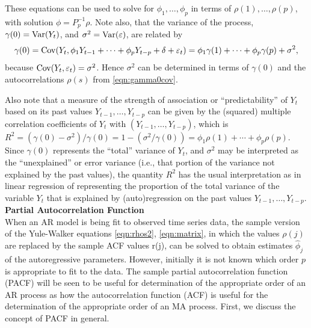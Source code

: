 These equations can be used to solve for $\phi_1, \ldots, \phi_p$ in terms of $\rho(1), \ldots, \rho(p)$, with solution $\phi = P_p^{-1} \rho$. Note also, that the variance of the process, $\gamma(0) = \operatorname{Var}(Y_t)$, and $\sigma^2= \operatorname{Var}(\varepsilon)$, are related by
	\begin{equation} \label{eqn:gamma0cov}
	\gamma(0)= \cov(Y_t, \phi_1 Y_{t-1} + \cdots + \phi_p Y_{t-p} + \delta + \varepsilon_t)= \phi_1 \gamma(1) + \cdots + \phi_p \gamma(p) + \sigma^2,
	\end{equation}
because $\operatorname{Cov}(Y_t, \varepsilon_t)= \sigma^2$. Hence $\sigma^2$ can be determined in terms of $\gamma(0)$ and the autocorrelations $\rho(s)$ from \eqref{eqn:gamma0cov}.


Also note that a measure of the strength of association or ``predictability'' of $Y_t$ based on its past values $Y_{t-1}, \ldots, Y_{t-p}$ can be given by the (squared) multiple correlation coefficients of $Y_t$ with $(Y_{t-1}, \ldots, Y_{t-p})$, which is $R^2= (\gamma(0) - \sigma^2)/\gamma(0) = 1 - ( \sigma^2 / \gamma(0) ) = \phi_1 \rho(1) + \cdots + \phi_p \rho(p)$. Since $\gamma(0)$ represents the ``total'' variance of $Y_t$, and $\sigma^2$ may be interpreted as the ``unexplained'' or error variance (i.e., that portion of the variance not explained by the past values), the quantity $R^2$ has the usual interpretation as in linear regression of representing the proportion of the total variance of the variable $Y_t$ that is explained by (auto)regression on the past values $Y_{t-1}, \ldots, Y_{t-p}$. \\


\noindent\textbf{Partial Autocorrelation Function} \\


When an AR model is being fit to observed time series data, the sample version of the Yule-Walker equations \eqref{eqn:rhos2}, \eqref{eqn:matrix}, in which the values $\rho(j)$ are replaced by the sample ACF values r(j), can be solved to obtain estimates $\hat{\phi}_j$ of the autoregressive parameters. However, initially it is not known which order $p$ is appropriate to fit to the data. The sample partial autocorrelation function (PACF) will be seen to be useful for determination of the appropriate order of an AR process as how the autocorrelation function (ACF) is useful for the determination of the appropriate order of an MA process. First, we discuss the concept of PACF in general.


